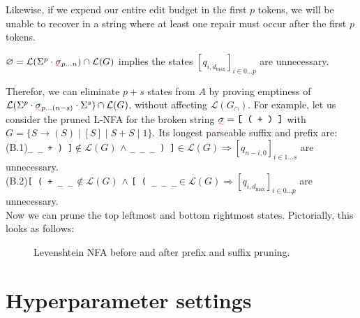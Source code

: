 \documentclass[sigplan,review,acmsmall,nonacm,screen,anonymous]{acmart}\settopmatter{printfolios=false,printccs=false,printacmref=false}
\begin{document}
Likewise, if we expend our entire edit budget in the first $p$ tokens, we will be unable to recover in a string where at least one repair must occur after the first $p$ tokens.

\begin{theorem}
  $\varnothing = \mathcal{L}(\Sigma^p\cdot\err\sigma_{p\ldots n})\cap \mathcal{L}(G)$ implies the states $[q_{i, d_{\max}}]_{i \in 0\ldots p}$ are unnecessary.
\end{theorem}

Therefor, we can eliminate $p+s$ states from $A$ by proving emptiness of $\mathcal{L}(\Sigma^p\cdot\err\sigma_{p\ldots (n-s)}\cdot\Sigma^s) \cap \mathcal{L}(G)$, without affecting $\mathcal{L}(G_\cap)$. For example, let us consider the pruned L-NFA for the broken string $\err\sigma = \texttt{[ ( + ) ]}$ with $G = \{S \rightarrow ( S ) \mid [ S ] \mid S + S \mid 1\}$. Its longest parseable suffix and prefix are:\\

\noindent(B.1)\phantom{..}\texttt{\_ \_ + ) ]}\phantom{.}$\not\in \mathcal{L}(G)$\phantom{...}\phantom{...} $\land$ \phantom{...}\texttt{\_ \_ \_ ) ]}\phantom{...}$\in \mathcal{L}(G)$\phantom{...}\phantom{...}$\Longrightarrow [q_{n-i, 0}]_{i \in 1\ldots s}$ are unnecessary.\\
\noindent(B.2)\phantom{..}\texttt{[ ( + \_ \_}$\hspace{2pt}\not\in \mathcal{L}(G)$\phantom{...}\phantom{...} $\land$ \phantom{...}\texttt{[ ( \_ \_ \_}\phantom{...}$\in \mathcal{L}(G)$\phantom{...}\phantom{...}$\Longrightarrow [q_{i, d_{\max}}]_{i \in 0\ldots p}$ are unnecessary.\\

\noindent Now we can prune the top leftmost and bottom rightmost states. Pictorially, this looks as follows:

\begin{figure}[H]
  \resizebox{0.47\textwidth}{!}{
    
  }
  \resizebox{0.47\textwidth}{!}{
    
  }
  \caption{Levenshtein NFA before and after prefix and suffix pruning.}
\end{figure}\vspace{-0.175cm}

\section{Hyperparameter settings}\label{sec:hyperparams}
\end{document}
